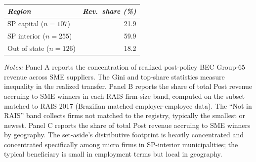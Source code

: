 \begin{table}[!htbp]
\begin{threeparttable}
\begin{tabular}{lr}
\textit{Region} & \textit{Rev.\ share (\%)} \\
\midrule
SP capital ($n = 107$) & 21.9 \\
SP interior ($n = 255$) & 59.9 \\
Out of state ($n = 126$) & 18.2 \\
\bottomrule
\end{tabular}
\begin{tablenotes}\footnotesize
\item \textit{Notes:} Panel A reports the concentration of realized post-policy BEC Group-65 revenue across SME suppliers. The Gini and top-share statistics measure inequality in the realized transfer. Panel B reports the share of total Post revenue accruing to SME winners in each RAIS firm-size band, computed on the subset matched to RAIS 2017 (Brazilian matched employer-employee data). The ``Not in RAIS'' band collects firms not matched to the registry, typically the smallest or newest. Panel C reports the share of total Post revenue accruing to SME winners by geography. The set-aside's distributive footprint is heavily concentrated and concentrated specifically among micro firms in SP-interior municipalities; the typical beneficiary is small in employment terms but local in geography.
\end{tablenotes}
\end{threeparttable}
\end{table}
